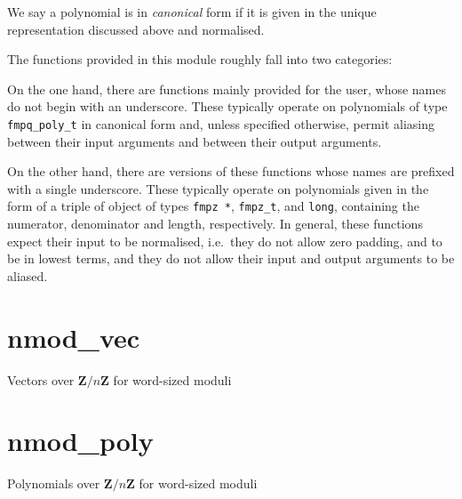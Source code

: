 \documentclass[a4paper,10pt]{book}
\newcommand{\Z}{\mathbf{Z}}%
\newcommand{\code}{\lstinline}
\begin{document}
We say a polynomial is in \emph{canonical} form if it is given in the 
unique representation discussed above and normalised.

The functions provided in this module roughly fall into two categories:

On the one hand, there are functions mainly provided for the user, whose 
names do not begin with an underscore.  These typically operate on 
polynomials of type \code{fmpq_poly_t} in canonical form and, unless 
specified otherwise, permit aliasing between their input arguments and 
between their output arguments.

On the other hand, there are versions of these functions whose names are 
prefixed with a single underscore.  These typically operate on polynomials 
given in the form of a triple of object of types \code{fmpz *}, 
\code{fmpz_t}, and \code{long}, containing the numerator, denominator and 
length, respectively.  In general, these functions expect their input to 
be normalised, i.e.\ they do not allow zero padding, and to be in lowest 
terms, and they do not allow their input and output arguments to be aliased.




\chapter{nmod\_vec}
\epigraph{Vectors over $\Z / n \Z$ for word-sized moduli}{}




\chapter{nmod\_poly}
\epigraph{Polynomials over $\Z / n \Z$ for word-sized moduli}{}



\end{document}
